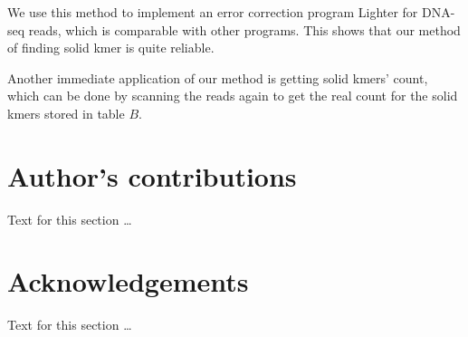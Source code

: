 \documentclass[10pt]{article}
\begin{document}
We use this method to implement an error correction program Lighter for DNA-seq reads, which is comparable with other programs. This shows that our method of finding solid kmer is quite reliable. 

Another immediate application of our method is getting solid kmers' count, which can be done by scanning the reads again to get the real count for the solid kmers stored in table $B$.

\section*{Author's contributions}
    Text for this section \ldots

    

\section*{Acknowledgements}
  Text for this section \ldots



\end{document}
